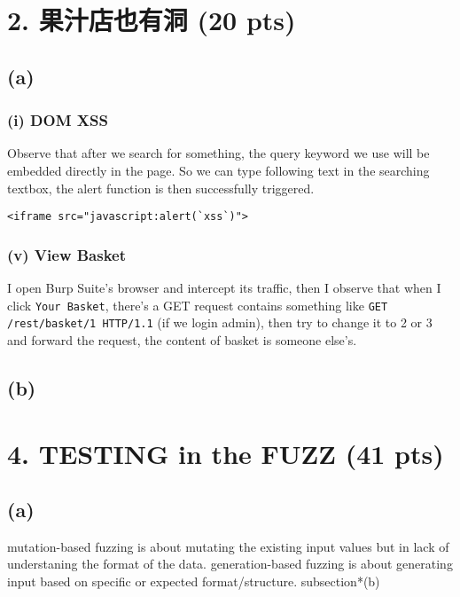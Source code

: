 \documentclass[12pt]{article}
\title{\mytitle}
\author{\textbf{\myauthor}}
\date{\today}
\begin{document}
\maketitle

\section*{2. 果汁店也有洞 (20 pts)}
\subsection*{(a)}
\subsubsection*{(i) DOM XSS}
Observe that after we search for something, the query keyword we use will be embedded directly in the page. So we can type following text in the searching textbox, the alert function is then successfully triggered.
\begin{verbatim}
<iframe src="javascript:alert(`xss`)">
\end{verbatim}
\subsubsection*{(v) View Basket}
I open Burp Suite's browser and intercept its traffic, then I observe that when I click \texttt{Your Basket}, there's a GET request contains something like \texttt{GET /rest/basket/1 HTTP/1.1} (if we login admin), then try to change it to 2 or 3 and forward the request, the content of basket is someone else's.


\subsection*{(b)}

\newpage
\section*{4. TESTING in the FUZZ (41 pts)}
\subsection*{(a)}
mutation-based fuzzing is about mutating the existing input values but in lack of understaning the format of the data. generation-based fuzzing is about generating input based on specific or expected format/structure.
subsection*{(b)}
\end{document}
